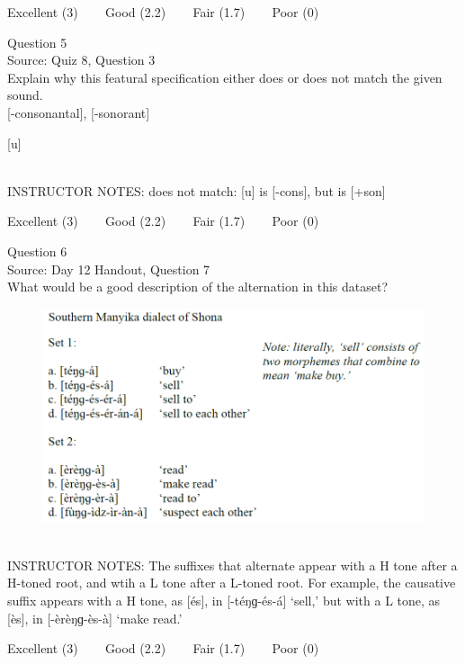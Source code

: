 \documentclass[12pt]{article}
\begin{document}
\vfill
Excellent (3) ~~~ Good (2.2) ~~~ Fair (1.7) ~~~ Poor (0)
\newpage

{\large Question 5}\\

Source: Quiz 8, Question 3\\

Explain why this featural specification either does or does not match the given sound.\\

{[-consonantal]}, {[-sonorant]}

{[u]}


~\\
INSTRUCTOR NOTES: does not match: [u] is [-cons], but is [+son]


\vfill
Excellent (3) ~~~ Good (2.2) ~~~ Fair (1.7) ~~~ Poor (0)
\newpage

{\large Question 6}\\

Source: Day 12 Handout, Question 7\\

What would be a good description of the alternation in this dataset?\\

\begin{figure}[H]
\includegraphics{../images/shona.png}
\end{figure}

~\\
INSTRUCTOR NOTES: The suffixes that alternate appear with a H tone after a H-toned root, and wtih a L tone after a L-toned root. For example, the causative suffix appears with a H tone, as [és], in [-téŋɡ-és-á] ‘sell,’ but with a L tone, as [ès], in [-èrèŋɡ-ès-à] ‘make read.’


\vfill
Excellent (3) ~~~ Good (2.2) ~~~ Fair (1.7) ~~~ Poor (0)
\newpage
\end{document}
